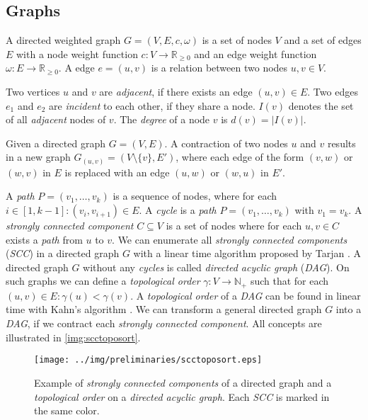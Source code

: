 \subsection{Graphs}

\begin{definition}
A directed weighted graph $G = (V,E,c,\omega)$ is a set of nodes $V$ 
and a set of edges $E$ with a node weight function 
$c: V \rightarrow \mathbb{R}_{\ge 0}$ and an edge weight 
function $\omega: E \rightarrow \mathbb{R}_{\ge 0}$. A edge $e = (u,v)$ 
is a relation between two nodes $u,v \in V$.
\label{def:hypergraph}
\end{definition}

Two vertices $u$ and $v$ are \emph{adjacent}, if there exists an edge
$(u,v) \in E$. Two edges $e_1$ and $e_2$ are \emph{incident} to each other, if they
share a node. $I(v)$ denotes the set of all \emph{adjacent} nodes of 
$v$. The \emph{degree} of a node $v$ is $d(v) = |I(v)|$.

\begin{definition}
Given a directed graph $G = (V,E)$. A contraction of two nodes
$u$ and $v$ results in a new graph $G_{(u,v)} = (V\setminus\{v\},E')$, where
each edge of the form $(v,w)$ or $(w,v)$ in $E$ is replaced with an edge 
$(u,w)$ or $(w,u)$ in $E'$.
\label{def:contraction}
\end{definition}

A \emph{path} $P = (v_1,\ldots,v_k)$ is a sequence of nodes, where for
each $i \in [1,k-1]: (v_i,v_{i+1}) \in E$. A \emph{cycle} is a \emph{path}
$P = (v_1,\ldots,v_k)$ with $v_1 = v_k$. A \emph{strongly connected 
component} $C \subseteq V$ is a set of nodes where for each $u,v \in C$
exists a \emph{path} from $u$ to $v$. We can enumerate all \emph{strongly
connected components} (\emph{SCC}) in a directed graph $G$ with a linear time algorithm
proposed by Tarjan \cite{tarjan1972depth}. A directed graph $G$ without
any \emph{cycles} is called \emph{directed acyclic graph} (\emph{DAG}). On such
graphs we can define a \emph{topological order} $\gamma: V \rightarrow \mathbb{N}_+$ such
that for each $(u,v) \in E: \gamma(u) < \gamma(v)$. A \emph{topological order}
of a \emph{DAG} can be found in linear time with Kahn's algorithm \cite{kahn1962topological}.
We can transform a general directed graph $G$ into a \emph{DAG}, if we contract
each \emph{strongly connected component}. All concepts are illustrated in 
\autoref{img:scctoposort}.

\begin{figure}
\centering
\texttt{[image: ../img/preliminaries/scctoposort.eps]}
\caption{Example of \emph{strongly connected components} of a directed graph and
         a \emph{topological order} on a \emph{directed acyclic graph}. Each 
         \emph{SCC} is marked in the same color.} 
\label{img:scctoposort}
\end{figure}

